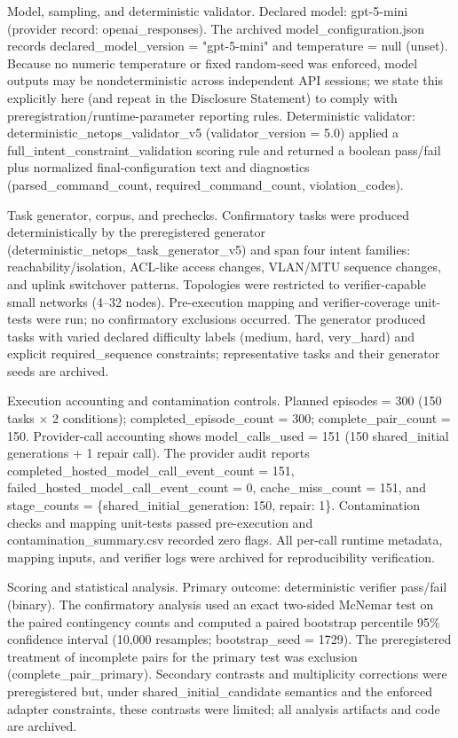 \documentclass[conference]{IEEEtran}
\begin{document}
Model, sampling, and deterministic validator. Declared model: gpt-5-mini (provider record: openai\_responses). The archived model\_configuration.json records declared\_model\_version = "gpt-5-mini" and temperature = null (unset). Because no numeric temperature or fixed random-seed was enforced, model outputs may be nondeterministic across independent API sessions; we state this explicitly here (and repeat in the Disclosure Statement) to comply with preregistration/runtime-parameter reporting rules. Deterministic validator: deterministic\_netops\_validator\_v5 (validator\_version = 5.0) applied a full\_intent\_constraint\_validation scoring rule and returned a boolean pass/fail plus normalized final-configuration text and diagnostics (parsed\_command\_count, required\_command\_count, violation\_codes).

Task generator, corpus, and prechecks. Confirmatory tasks were produced deterministically by the preregistered generator (deterministic\_netops\_task\_generator\_v5) and span four intent families: reachability/isolation, ACL-like access changes, VLAN/MTU sequence changes, and uplink switchover patterns. Topologies were restricted to verifier-capable small networks (4--32 nodes). Pre-execution mapping and verifier-coverage unit-tests were run; no confirmatory exclusions occurred. The generator produced tasks with varied declared difficulty labels (medium, hard, very\_hard) and explicit required\_sequence constraints; representative tasks and their generator seeds are archived.

Execution accounting and contamination controls. Planned episodes = 300 (150 tasks \ensuremath{\times} 2 conditions); completed\_episode\_count = 300; complete\_pair\_count = 150. Provider-call accounting shows model\_calls\_used = 151 (150 shared\_initial generations + 1 repair call). The provider audit reports completed\_hosted\_model\_call\_event\_count = 151, failed\_hosted\_model\_call\_event\_count = 0, cache\_miss\_count = 151, and stage\_counts = \{shared\_initial\_generation: 150, repair: 1\}. Contamination checks and mapping unit-tests passed pre-execution and contamination\_summary.csv recorded zero flags. All per-call runtime metadata, mapping inputs, and verifier logs were archived for reproducibility verification.

Scoring and statistical analysis. Primary outcome: deterministic verifier pass/fail (binary). The confirmatory analysis used an exact two-sided McNemar test on the paired contingency counts and computed a paired bootstrap percentile 95\% confidence interval (10,000 resamples; bootstrap\_seed = 1729). The preregistered treatment of incomplete pairs for the primary test was exclusion (complete\_pair\_primary). Secondary contrasts and multiplicity corrections were preregistered but, under shared\_initial\_candidate semantics and the enforced adapter constraints, these contrasts were limited; all analysis artifacts and code are archived.
\end{document}
